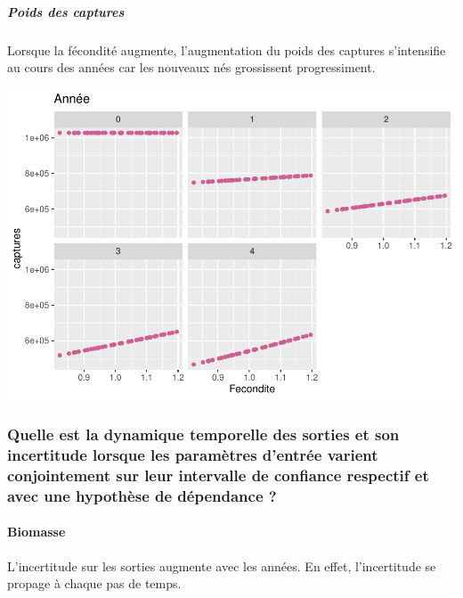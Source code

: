 \documentclass[
]{article}
\begin{document}
\hypertarget{poids-des-captures-4}{%
\subparagraph{Poids des captures}\label{poids-des-captures-4}}

Lorsque la fécondité augmente, l'augmentation du poids des captures
s'intensifie au cours des années car les nouveaux nés grossissent
progressiment.

\includegraphics{rapport_files/figure-latex/abzsss-1.pdf}

\hypertarget{quelle-est-la-dynamique-temporelle-des-sorties-et-son-incertitude-lorsque-les-paramuxe8tres-dentruxe9e-varient-conjointement-sur-leur-intervalle-de-confiance-respectif-et-avec-une-hypothuxe8se-de-duxe9pendance}{%
\subsubsection{Quelle est la dynamique temporelle des sorties et son
incertitude lorsque les paramètres d'entrée varient conjointement sur
leur intervalle de confiance respectif et avec une hypothèse de
dépendance
?}\label{quelle-est-la-dynamique-temporelle-des-sorties-et-son-incertitude-lorsque-les-paramuxe8tres-dentruxe9e-varient-conjointement-sur-leur-intervalle-de-confiance-respectif-et-avec-une-hypothuxe8se-de-duxe9pendance}}

\hypertarget{biomasse-6}{%
\paragraph{Biomasse}\label{biomasse-6}}

L'incertitude sur les sorties augmente avec les années. En effet,
l'incertitude se propage à chaque pas de temps.
\end{document}
